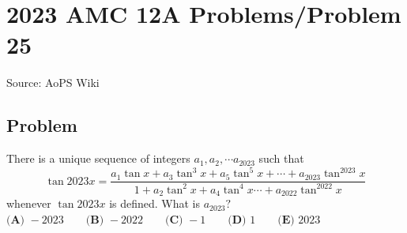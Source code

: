 \documentclass[12pt]{article}
\begin{document}
\section*{{2023 AMC 12A Problems/Problem 25}}
Source: AoPS Wiki

\subsection*{Problem}
There is a unique sequence of integers $a_1, a_2, \cdots a_{2023}$ such that \[\tan2023x = \frac{a_1 \tan x + a_3 \tan^3 x + a_5 \tan^5 x + \cdots + a_{2023} \tan^{2023} x}{1 + a_2 \tan^2 x + a_4 \tan^4 x \cdots + a_{2022} \tan^{2022} x}\] whenever $\tan 2023x$ is defined. What is $a_{2023}?$ $\textbf{(A) } -2023 \qquad\textbf{(B) } -2022 \qquad\textbf{(C) } -1 \qquad\textbf{(D) } 1 \qquad\textbf{(E) } 2023$
\end{document}
